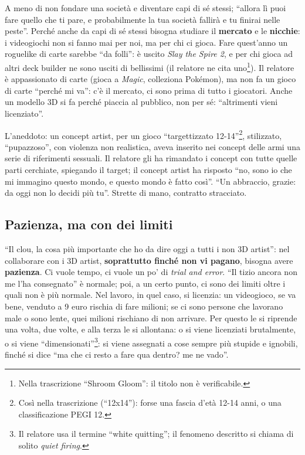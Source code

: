 A meno di non fondare una società e diventare capi di sé stessi; ``allora lì
puoi fare quello che ti pare, e probabilmente la tua società fallirà e tu
finirai nelle peste''. Perché anche da capi di sé stessi bisogna studiare il
\textbf{mercato} e le \textbf{nicchie}: i videogiochi non si fanno mai per noi,
ma per chi ci gioca. Fare quest'anno un roguelike di carte sarebbe ``da
folli'': è uscito \emph{Slay the Spire 2}, e per chi gioca ad altri deck builder
ne sono usciti di bellissimi (il relatore ne cita uno\footnote{Nella
trascrizione ``Shroom Gloom'': il titolo non è verificabile.}). Il relatore è
appassionato di carte (gioca a \emph{Magic}, colleziona Pokémon), ma non fa un
gioco di carte ``perché mi va'': c'è il mercato, ci sono prima di tutto i
giocatori. Anche un modello 3D si fa perché piaccia al pubblico, non per sé:
``altrimenti vieni licenziato''.

L'aneddoto: un concept artist, per un gioco ``targettizzato 12-14''\footnote{Così
nella trascrizione (``12x14''): forse una fascia d'età 12-14 anni, o una
classificazione PEGI 12.}, stilizzato, ``pupazzoso'', con violenza non
realistica, aveva inserito nei concept delle armi una serie di riferimenti
sessuali. Il relatore gli ha rimandato i concept con tutte quelle parti
cerchiate, spiegando il target; il concept artist ha risposto ``no, sono io che
mi immagino questo mondo, e questo mondo è fatto così''. ``Un abbraccio,
grazie: da oggi non lo decidi più tu''. Strette di mano, contratto stracciato.

\subsection{Pazienza, ma con dei limiti}

``Il clou, la cosa più importante che ho da dire oggi a tutti i non 3D artist'':
nel collaborare con i 3D artist, \textbf{soprattutto finché non vi pagano},
bisogna avere \textbf{pazienza}. Ci vuole tempo, ci vuole un po' di
\emph{trial and error}. ``Il tizio ancora non me l'ha consegnato'' è normale;
poi, a un certo punto, ci sono dei limiti oltre i quali non è più normale. Nel
lavoro, in quel caso, si licenzia: un videogioco, se va bene, venduto a 9 euro
rischia di fare milioni; se ci sono persone che lavorano male o sono lente,
quei milioni rischiano di non arrivare. Per questo le si riprende una volta, due
volte, e alla terza le si allontana: o si viene licenziati brutalmente, o si
viene ``dimensionati''\footnote{Il relatore usa il termine ``white quitting'';
il fenomeno descritto si chiama di solito \emph{quiet firing}.}: si viene
assegnati a cose sempre più stupide e ignobili, finché si dice ``ma che ci
resto a fare qua dentro? me ne vado''.

